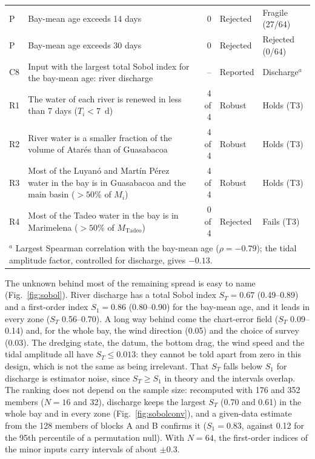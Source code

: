\documentclass[a4paper,fleqn]{ems-dc}
\begin{document}
\begin{table}[!t]
\begin{tabular}{lp{9.6cm}rll}
P & Bay-mean age exceeds 14 days & 0 & Rejected & Fragile (27/64)\\
P & Bay-mean age exceeds 30 days & 0 & Rejected & Rejected (0/64)\\
C8 & Input with the largest total Sobol index for the bay-mean age: river discharge & -- &
Reported & Discharge$^{a}$\\
\midrule
R1 & The water of each river is renewed in less than 7 days ($T_i < 7$~d) & 4 of 4 & Robust & Holds (T3)\\
R2 & River water is a smaller fraction of the volume of Atar\'es than of Guasabacoa & 4 of 4 & Robust & Holds (T3)\\
R3 & Most of the Luyan\'o and Mart\'in P\'erez water in the bay is in Guasabacoa and the
main basin ($>50$\% of $M_i$) & 4 of 4 & Robust & Holds (T3)\\
R4 & Most of the Tadeo water in the bay is in Marimelena ($>50$\% of $M_\mathrm{Tadeo}$) & 0 of 4 & Rejected & Fails (T3)\\
\bottomrule
\multicolumn{5}{l}{\footnotesize $^{a}$ Largest Spearman correlation with the bay-mean age
($\rho = -0.79$); the tidal amplitude factor, controlled for discharge, gives $-0.13$.}\\
\end{tabular}
\end{table}

The unknown behind most of the remaining spread is easy to name (Fig.~\ref{fig:sobol}). River
discharge has a total Sobol index $S_T = 0.67$ (0.49--0.89) and a first-order index
$S_1 = 0.86$ (0.80--0.90) for the bay-mean age, and it leads in every zone ($S_T$
0.56--0.70). A long way behind come the chart-error field ($S_T$ 0.09--0.14) and, for the
whole bay, the wind direction (0.05) and the choice of survey (0.03). The dredging state,
the datum, the bottom drag, the wind speed and the tidal amplitude all have
$S_T \le 0.013$: they cannot be told apart from zero in this design, which is not the same
as being irrelevant. That $S_T$ falls below $S_1$ for discharge is estimator noise, since
$S_T \ge S_1$ in theory \citep{Saltelli2008} and the intervals overlap. The ranking does not
depend on the sample size: recomputed with 176 and 352 members ($N = 16$ and 32), discharge
keeps the largest $S_T$ (0.70 and 0.61) in the whole bay and in every zone
(Fig.~\ref{fig:sobolconv}), and a given-data estimate from the 128 members of blocks A and B
confirms it ($S_1 = 0.83$, against 0.12 for the 95th percentile of a permutation null).
With $N = 64$, the first-order indices of the minor inputs carry intervals of about
$\pm0.3$.
\end{document}
